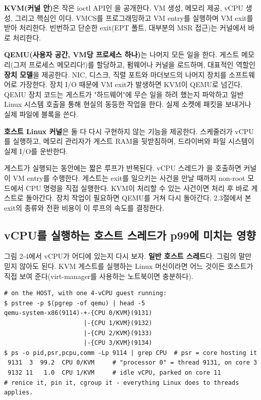 \begin{tbbitemize}
  \item \textbf{KVM(커널 안)}은 작은 ioctl API인 을 공개한다. VM 생성, 메모리 제공, vCPU 생성, 그리고 핵심인 이다. VMCS를 프로그래밍하고 VM entry를 실행하며 VM exit를 받아 처리한다. 빈번하고 단순한 exit(EPT 폴트, 대부분의 MSR 접근)는 커널에서 바로 처리한다.
  \item \textbf{QEMU(사용자 공간, VM당 프로세스 하나)}는 나머지 모든 일을 한다. 게스트 메모리(그저 프로세스 메모리다!)를 할당하고, 펌웨어나 커널을 로드하며, 대표적인 역할인 \textbf{장치 모델}을 제공한다. NIC, 디스크, 직렬 포트와 마더보드의 나머지 장치를 소프트웨어로 가장한다. 장치 I/O 때문에 VM exit가 발생하면 KVM이 QEMU로 넘긴다. QEMU 장치 코드는 게스트가 "하드웨어"에 무슨 일을 하려 했는지 파악하고 일반 Linux 시스템 호출을 통해 현실의 동등한 작업을 한다. 실제 소켓에 패킷을 보내거나 실제 파일에 블록을 쓴다.
  \item \textbf{호스트 Linux 커널}은 둘 다 다시 구현하지 않는 기능을 제공한다. 스케줄러가 vCPU를 실행하고, 메모리 관리자가 게스트 RAM을 뒷받침하며, 드라이버와 파일 시스템이 실제 I/O를 운반한다.
\end{tbbitemize}

게스트가 실행되는 동안에는 짧은 루프가 반복된다. vCPU 스레드가 을 호출하면 커널이 VM entry를 수행한다. 게스트는 exit를 일으키는 사건을 만날 때까지 non-root 모드에서 CPU 명령을 직접 실행한다. KVM이 처리할 수 있는 사건이면 처리 후 바로 게스트로 돌아간다. 장치 작업이 필요하면 QEMU를 거쳐 다시 돌아간다. 2.3절에서 본 exit의 종류와 전환 비용이 이 루프의 속도를 결정한다.

\subsection*{vCPU를 실행하는 호스트 스레드가 p99에 미치는 영향}

그림 2-4에서 vCPU가 어디에 있는지 다시 보자. \textbf{일반 호스트 스레드}다. 그림의 말만 믿지 않아도 된다. KVM 게스트를 실행하는 Linux 머신이라면 어느 것이든 호스트가 직접 보여 준다(virt-manager를 사용하는 노트북이면 충분하다).

\begin{terminalbox}
\begin{Verbatim}[breaklines=true,breakanywhere=true,fontsize=\small,formatcom=\color{tbbtermfg},codes=\tbbcodeactive]
# on the HOST, with one 4-vCPU guest running:
$ pstree -p $(pgrep -of qemu) | head -5
qemu-system-x86(9114)-+-{CPU 0/KVM}(9131)
                      |-{CPU 1/KVM}(9132)
                      |-{CPU 2/KVM}(9133)
                      |-{CPU 3/KVM}(9134)
$ ps -o pid,psr,pcpu,comm -Lp 9114 | grep CPU  # psr = core hosting it
 9131  3  99.2  CPU 0/KVM     # "processor 0" = thread 9131, on core 3
 9132 11   1.0  CPU 1/KVM     # idle vCPU, parked on core 11
# renice it, pin it, cgroup it - everything Linux does to threads applies.
\end{Verbatim}
\end{terminalbox}

